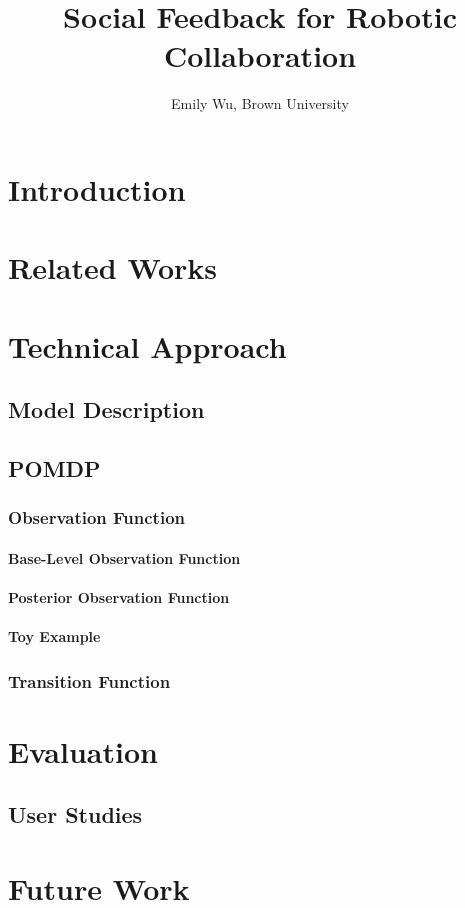 \documentclass{article}
\title{Social Feedback for Robotic Collaboration}
\author{Emily Wu, Brown University}
\begin{document}
\maketitle

\tableofcontents

\section{Introduction}

\section{Related Works}

\section{Technical Approach}

\subsection{Model Description}

\subsection{POMDP}

\subsubsection{Observation Function}
\paragraph{Base-Level Observation Function}
\paragraph{Posterior Observation Function}
\paragraph{Toy Example}
\subsubsection{Transition Function}


\section{Evaluation}

\subsection{User Studies}

\section{Future Work}
\end{document}
